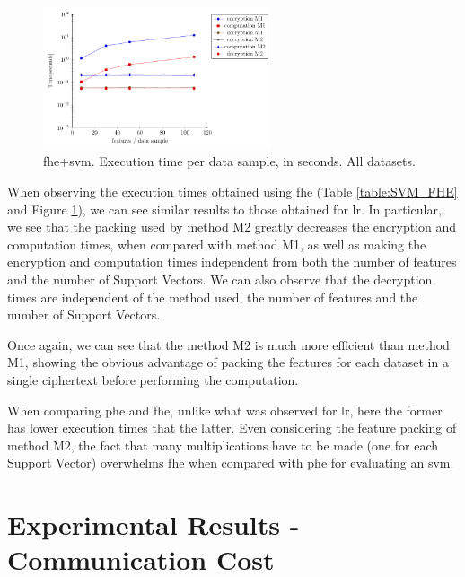 \begin{figure}[hpt]
\centering
\includegraphics[width=0.60\textwidth]{images/graphs/svm_fhe.pdf}
\caption{\acs{fhe}+\acs{svm}. Execution time per data sample, in seconds. All datasets.}
\label{fig:svm-fhe}
\end{figure}

When observing the execution times obtained using \ac{fhe} (Table \ref{table:SVM_FHE} and Figure \ref{fig:svm-fhe}), we can see similar results to those obtained for \ac{lr}. In particular, we see that the packing used by method M2 greatly decreases the encryption and computation times, when compared with method M1, as well as making the encryption and computation times independent from both the number of features and the number of Support Vectors. 
We can also observe that the decryption times are independent of the method used, the number of features and the number of Support Vectors.

Once again, we can see that the method M2 is much more efficient than method M1, showing the obvious advantage of packing the features for each dataset in a single ciphertext before performing the computation.

When comparing \ac{phe} and \ac{fhe}, unlike what was observed for \ac{lr}, here the former has lower execution times that the latter. Even considering the feature packing of method M2, the fact that many multiplications have to be made (one for each Support Vector) overwhelms \ac{fhe} when compared with \ac{phe} for evaluating an \ac{svm}.


\section{Experimental Results - Communication Cost}
\label{sec:CommunicationCosts}

